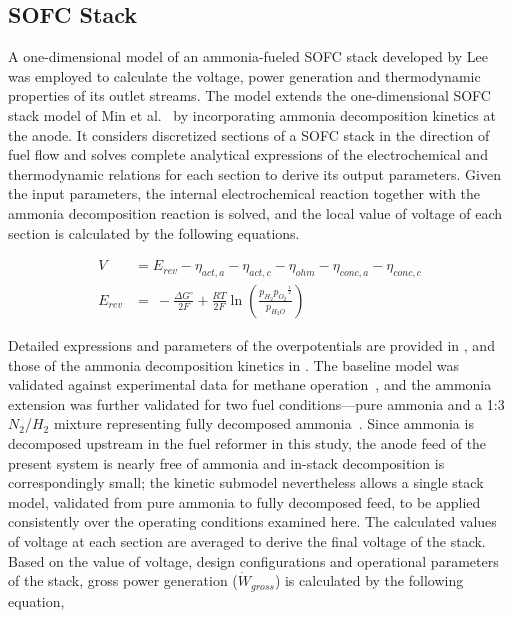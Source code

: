 \documentclass[a4paper,10pt]{cas-dc} %
\begin{document}
\subsection{SOFC Stack}

A one-dimensional model of an ammonia-fueled SOFC stack developed by Lee~\cite{lee2023sofc} was employed to calculate the voltage, power generation and thermodynamic properties of its outlet streams.
The model extends the one-dimensional SOFC stack model of Min et al.~\cite{MIN2020112614} by incorporating ammonia decomposition kinetics at the anode.
It considers discretized sections of a SOFC stack in the direction of fuel flow and solves complete analytical expressions of the electrochemical and thermodynamic relations for each section to derive its output parameters.
Given the input parameters, the internal electrochemical reaction together with the ammonia decomposition reaction is solved, and the local value of voltage of each section is calculated by the following equations.

\begin{align}
V &= E_{rev} - \eta_{act,a} - \eta_{act,c} - \eta_{ohm} - \eta_{conc,a} - \eta_{conc,c} \label{eq:cell-voltage} \\
E_{rev} &= \  - \frac{\Delta G^{\circ}}{2F} + \frac{RT}{2F}\ln\left( \frac{p_{H_{2}}{p_{O_{2}}}^{\frac{1}{2}}}{p_{H_{2}O}} \right) \label{eq:nernst}
\end{align}

Detailed expressions and parameters of the overpotentials are provided in \cite{MIN2020112614}, and those of the ammonia decomposition kinetics in \cite{lee2023sofc}.
The baseline model was validated against experimental data for methane operation~\cite{MIN2020112614}, and the ammonia extension was further validated for two fuel conditions---pure ammonia and a 1:3 \({N}_{2}\)/\({H}_{2}\) mixture representing fully decomposed ammonia~\cite{lee2023sofc}.
Since ammonia is decomposed upstream in the fuel reformer in this study, the anode feed of the present system is nearly free of ammonia and in-stack decomposition is correspondingly small; the kinetic submodel nevertheless allows a single stack model, validated from pure ammonia to fully decomposed feed, to be applied consistently over the operating conditions examined here.
The calculated values of voltage at each section are averaged to derive the final voltage of the stack.
Based on the value of voltage, design configurations and operational parameters of the stack, gross power generation ($\dot{W}_{gross}$) is calculated by the following equation,
\end{document}
